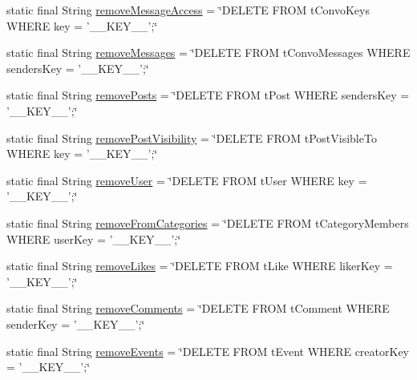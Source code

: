 \begin{DoxyCompactItemize}
\item 
static final String \hyperlink{classballmerpeak_1_1turtlenet_1_1server_1_1DBStrings_aa376b74543195cc63ee7e443131d2822}{remove\-Message\-Access} = \char`\"{}D\-E\-L\-E\-T\-E F\-R\-O\-M t\-Convo\-Keys W\-H\-E\-R\-E key = '\-\_\-\-\_\-\-K\-E\-Y\-\_\-\-\_\-';\char`\"{}
\item 
static final String \hyperlink{classballmerpeak_1_1turtlenet_1_1server_1_1DBStrings_a1b06410e67831509b9f39c59360cd3a4}{remove\-Messages} = \char`\"{}D\-E\-L\-E\-T\-E F\-R\-O\-M t\-Convo\-Messages W\-H\-E\-R\-E senders\-Key = '\-\_\-\-\_\-\-K\-E\-Y\-\_\-\-\_\-';\char`\"{}
\item 
static final String \hyperlink{classballmerpeak_1_1turtlenet_1_1server_1_1DBStrings_a558a3b46958bfa577aecc36b4f2c7b2f}{remove\-Posts} = \char`\"{}D\-E\-L\-E\-T\-E F\-R\-O\-M t\-Post W\-H\-E\-R\-E senders\-Key = '\-\_\-\-\_\-\-K\-E\-Y\-\_\-\-\_\-';\char`\"{}
\item 
static final String \hyperlink{classballmerpeak_1_1turtlenet_1_1server_1_1DBStrings_a2541bcdbb1f43144be6a70b42199b0d2}{remove\-Post\-Visibility} = \char`\"{}D\-E\-L\-E\-T\-E F\-R\-O\-M t\-Post\-Visible\-To W\-H\-E\-R\-E key = '\-\_\-\-\_\-\-K\-E\-Y\-\_\-\-\_\-';\char`\"{}
\item 
static final String \hyperlink{classballmerpeak_1_1turtlenet_1_1server_1_1DBStrings_a7280cd9a150a098b62c0d23a88eeb566}{remove\-User} = \char`\"{}D\-E\-L\-E\-T\-E F\-R\-O\-M t\-User W\-H\-E\-R\-E key = '\-\_\-\-\_\-\-K\-E\-Y\-\_\-\-\_\-';\char`\"{}
\item 
static final String \hyperlink{classballmerpeak_1_1turtlenet_1_1server_1_1DBStrings_a34489c428648e96854f7ae0665fa2830}{remove\-From\-Categories} = \char`\"{}D\-E\-L\-E\-T\-E F\-R\-O\-M t\-Category\-Members W\-H\-E\-R\-E user\-Key = '\-\_\-\-\_\-\-K\-E\-Y\-\_\-\-\_\-';\char`\"{}
\item 
static final String \hyperlink{classballmerpeak_1_1turtlenet_1_1server_1_1DBStrings_a93fcbcf4eaf96862a3db95dec6b1fbcb}{remove\-Likes} = \char`\"{}D\-E\-L\-E\-T\-E F\-R\-O\-M t\-Like W\-H\-E\-R\-E liker\-Key = '\-\_\-\-\_\-\-K\-E\-Y\-\_\-\-\_\-';\char`\"{}
\item 
static final String \hyperlink{classballmerpeak_1_1turtlenet_1_1server_1_1DBStrings_a54bb85c47ce1672a4adecc4104caa10e}{remove\-Comments} = \char`\"{}D\-E\-L\-E\-T\-E F\-R\-O\-M t\-Comment W\-H\-E\-R\-E sender\-Key = '\-\_\-\-\_\-\-K\-E\-Y\-\_\-\-\_\-';\char`\"{}
\item 
static final String \hyperlink{classballmerpeak_1_1turtlenet_1_1server_1_1DBStrings_a107f35f84bfad780727aa44465cf9c59}{remove\-Events} = \char`\"{}D\-E\-L\-E\-T\-E F\-R\-O\-M t\-Event W\-H\-E\-R\-E creator\-Key = '\-\_\-\-\_\-\-K\-E\-Y\-\_\-\-\_\-';\char`\"{}
\end{DoxyCompactItemize}


